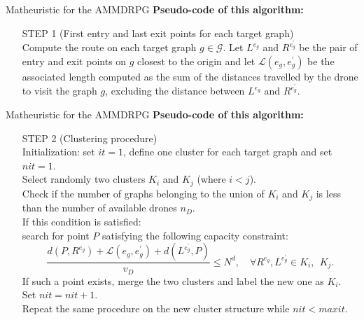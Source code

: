 \documentclass[slidestop,usepdftitle=false,10pt]{beamer}
\begin{document}
	\begin{frame}{Matheuristic for the AMMDRPG}
	   \textbf{Pseudo-code of this algorithm:}
        \begin{itemize} 
        \item[STEP 1] (First entry and last exit points for each target graph)\\
        Compute the route on each target graph $g \in \mathcal{G}$.
        Let $L^{e_{g}}$ and $R^{e^{'}_{g}}$ be the pair of entry and exit points on $g$ closest to the origin and let  $\mathcal L(e_{g}, e^{'}_{g})$ be the associated length computed as the sum of the distances travelled by the drone to visit the graph $g$, excluding the distance between $L^{e_{g}}$ and $R^{e^{'}_{g}}$.
        \end{itemize}
    \end{frame}
    \begin{frame}{Matheuristic for the AMMDRPG}
    	\textbf{Pseudo-code of this algorithm:}
        \begin{itemize}
        \small
        \item[STEP 2] (Clustering procedure)\\
        Initialization: set $it=1$, define one cluster for each target graph and set $nit=1$. \\
        Select randomly two clusters $K_i$ and $K_j$ (where $i<j$).\\
        Check if the number of graphs belonging to the union of $K_i$ and $K_j$ is less than the number of available drones $n_D$.\\
        If this condition is satisfied:\\
        search for point $P$ satisfying the following capacity constraint:
        $$
        \frac{d(P, R^{e_g}) + \mathcal L(e_{g}, e^{'}_{g}) + d(L^{e^{'}_{g}}, P)}{v_D} \leq N^d, \quad \forall R^{e_g}, L^{e^{'}_{g}} \in K_i, \:\: K_j.
        $$
        If such a point exists, merge the two clusters and label the new one as $K_i$.\\
        Set $nit=nit+1$.\\
        Repeat the same procedure on the new cluster structure while $nit < maxit$.
        \end{itemize}
    \end{frame}
    
\end{document}
